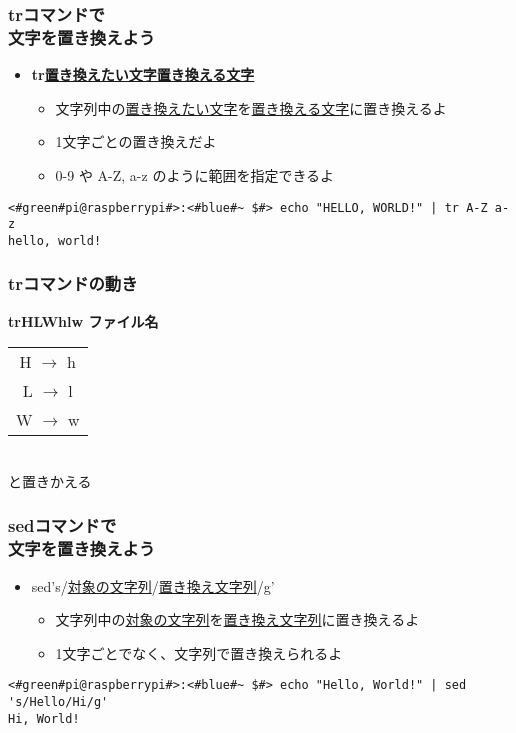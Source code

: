 \begin{frame}[fragile]
    \frametitle{trコマンドで\\文字を置き換えよう}
    \begin{itemize}
        \item {\bf tr\textvisiblespace\underline{置き換えたい文字}\textvisiblespace\underline{置き換える文字}}
        \begin{itemize}
            \small
            \item 文字列中の\underline{置き換えたい文字}を\underline{置き換える文字}に置き換えるよ
            \item 1文字ごとの置き換えだよ
            \item 0-9 や A-Z, a-z のように範囲を指定できるよ
        \end{itemize}
    \end{itemize}
    \begin{lstlisting}[title=範囲指定を使った置き換え, label=tr_range]
<#green#pi@raspberrypi#>:<#blue#~ $#> echo "HELLO, WORLD!" | tr A-Z a-z
hello, world!
    \end{lstlisting}
\end{frame}

\begin{frame}
    \frametitle{trコマンドの動き}
    \begin{center}
        {\bf tr\textvisiblespace HLW\textvisiblespace hlw ファイル名}\\
        \vspace{\zh}
        \begin{tabular}{c}
        H $\rightarrow$ h \\
        L $\rightarrow$ l \\
        W $\rightarrow$ w \\ 
        \end{tabular}\\
        と置きかえる
    \end{center}
\end{frame}

\begin{frame}[fragile]
    \frametitle{sedコマンドで\\文字を置き換えよう}
    \begin{itemize}
        \item sed\textvisiblespace 's/\underline{対象の文字列}/\underline{置き換え文字列}/g'
        \begin{itemize}
            \small
            \item 文字列中の\underline{対象の文字列}を\underline{置き換え文字列}に置き換えるよ
            \item 1文字ごとでなく、文字列で置き換えられるよ
        \end{itemize}
    \end{itemize}
    \begin{lstlisting}[title=sedでの文字の置き換え, label=sed_app]
<#green#pi@raspberrypi#>:<#blue#~ $#> echo "Hello, World!" | sed 's/Hello/Hi/g'
Hi, World!
    \end{lstlisting}
\end{frame}

